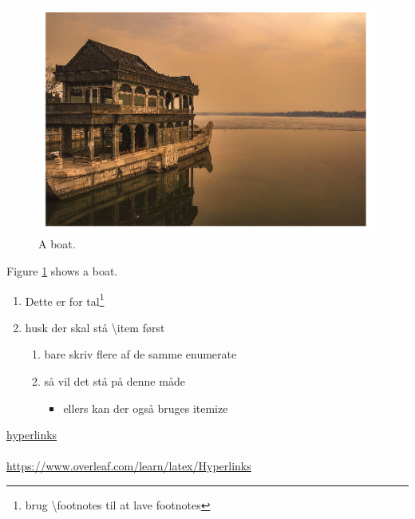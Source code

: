 \documentclass[12pt]{report}
\begin{document}
\newpage
\begin{figure}
  \includegraphics[width=\linewidth]{boat.png} 
  \caption{A boat.}
  \label{fig:boat1}
\end{figure}

Figure \ref{fig:boat1} shows a boat.
\newpage
\begin{enumerate}
\item Dette er for tal\footnote{brug \textbackslash footnotes til at lave footnotes}
\item husk der skal stå \textbackslash item først
\begin{enumerate}
\item bare skriv flere af de samme enumerate 
\item så vil det stå på denne måde 
\begin{itemize}
\item ellers kan der også bruges itemize
\end{itemize}
\end{enumerate}
\end{enumerate}
 \newpage 
 \href{https://www.overleaf.com/learn/latex/Hyperlinks} {hyperlinks} \\ \\
 \url{https://www.overleaf.com/learn/latex/Hyperlinks}
\end{document}

